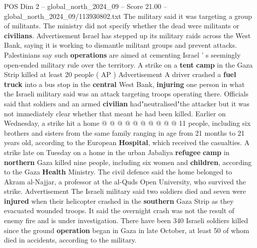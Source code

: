 \begin{textsample}{POS Dim 2 – global\_north\_2024\_09 – Score 21.00 – global\_north\_2024\_09/113930802.txt}
The military said it was targeting a group of militants.
The ministry did not specify whether the dead were militants or \textbf{civilians}.
Advertisement Israel has stepped up its military raids across the West Bank, saying it is working to dismantle militant groups and prevent attacks.
Palestinians say such \textbf{operations} are aimed at cementing Israel ' s seemingly open-ended military rule over the territory.
A strike on a \textbf{tent} \textbf{camp} in the Gaza Strip killed at least 20 people ( AP ) Advertisement A driver crashed a \textbf{fuel} \textbf{truck} into a bus stop in the \textbf{central} West Bank, \textbf{injuring} one person in what the Israeli military said was an attack targeting troops operating there.
Officials said that soldiers and an armed \textbf{civilian} had"neutralised"the attacker but it was not immediately clear whether that meant he had been killed.
Earlier on Wednesday, a strike hit a home @ @ @ @ @ @ @ @ @ @ 11 people, including six brothers and sisters from the same family ranging in age from 21 months to 21 years old, according to the European \textbf{Hospital}, which received the casualties.
A strike late on Tuesday on a home in the urban Jabaliya \textbf{refugee} \textbf{camp} in \textbf{northern} Gaza killed nine people, including six women and \textbf{children}, according to the Gaza \textbf{Health} Ministry.
The civil defence said the home belonged to Akram al-Najjar, a professor at the al-Quds Open University, who survived the strike.
Advertisement The Israeli military said two soldiers died and seven were \textbf{injured} when their helicopter crashed in the \textbf{southern} Gaza Strip as they evacuated wounded troops.
It said the overnight crash was not the result of enemy fire and is under investigation.
There have been 340 Israeli soldiers killed since the ground \textbf{operation} began in Gaza in late October, at least 50 of whom died in accidents, according to the military.

\end{textsample}
